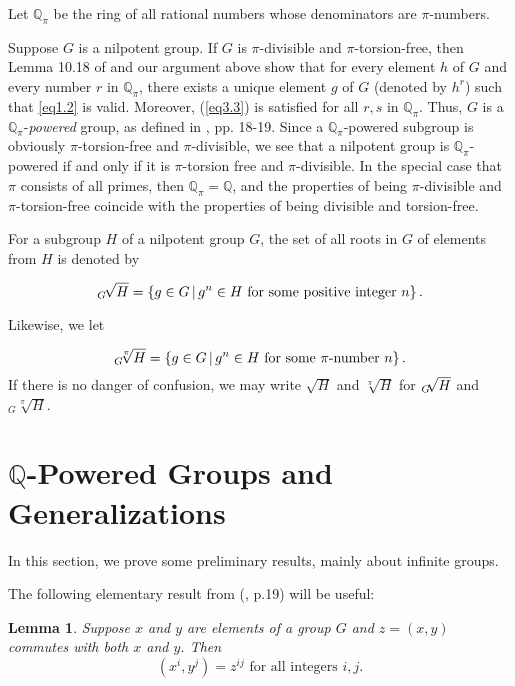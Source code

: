 \documentclass[mathscr]{amsart}
\theoremstyle{theorem}
\newtheorem{lemma}[theorem]{Lemma}
\theoremstyle{definition}
\numberwithin{equation}{section}
\def \({\left(}
\def \){\right)}
\def\Q{\mathbb{Q}}
\begin{document}
Let $\mathbb{Q}_\pi$ be the ring of all rational numbers whose
denominators are $\pi$-numbers.

Suppose $G$ is a nilpotent group.  If $G$ is $\pi$-divisible and
$\pi$-torsion-free, then Lemma 10.18 of \cite{Kh} and our argument
above show that for every element $h$ of $G$ and every number $r$ in
$\mathbb{Q}_\pi$, there exists a unique element $g$ of $G$ (denoted
by $h^r$) such that \eqref{eq1.2} is valid.
Moreover, (\ref{eq3.3}) is satisfied for all $r,s$ in
$\mathbb{Q}_\pi$.  Thus, $G$ is a $\mathbb{Q}_\pi$-{\it powered}
group, as defined in \cite{Kh}, pp. 18-19. Since a $\Q_\pi$-powered
subgroup is obviously $\pi$-torsion-free and $\pi$-divisible, we see
that a nilpotent group is $\Q_\pi$-powered if and only if it is
$\pi$-torsion free and $\pi$-divisible. In the special case that
$\pi$ consists of all primes, then $\mathbb{Q}_\pi=\mathbb{Q}$, and
the properties of being $\pi$-divisible and $\pi$-torsion-free
coincide with the properties of being divisible and torsion-free.

For a subgroup $H$ of a nilpotent group $G$, the set of all roots in
$G$ of elements from $H$ is denoted by

$$_G\hspace*{-0.05cm}\sqrt{H}=\left\{g\in G\,|\,g^n\in H\text{ for some positive integer }n\right\}.$$

Likewise, we let

$$_G\hspace*{-0.1cm}\sqrt[\pi]{H}=\left\{g\in G\,|\, g^n\in H\text{ for some }\pi\text{-number
}n\right\}.
$$
If there is no danger of confusion, we may write $\sqrt{H}$ and
$\sqrt[\pi]{H}$ for $_G\hspace*{-0.1cm}\sqrt{H}$ and
$_G\sqrt[\pi]{H}$.

\section{$\mathbb{Q}$-Powered Groups and Generalizations}
\label{sec2}

In this section, we prove some preliminary results, mainly about
infinite groups.  %

The following elementary result from (\cite{Gor}, p.19) will be
useful:

\begin{lemma}\label{lemma2.1-3-24}
Suppose $x$ and $y$ are elements of a group $G$ and $z=(x,y)$
commutes with both $x$ and $y$.  Then
$$
\(x^i,y^j\)=z^{ij}\text{ for all integers }i,j.
$$
\end{lemma}
\end{document}
